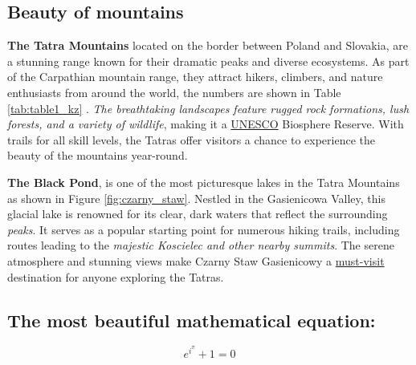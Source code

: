\setlength{\parskip}{10pt}
\subsection{Beauty of mountains}

\textbf{The Tatra Mountains} located on the border between Poland and Slovakia, are a stunning range known for their dramatic peaks and diverse ecosystems. As part of the Carpathian mountain range, they attract hikers, climbers, and nature enthusiasts from around the world, the numbers are shown in Table \ref{tab:table1_kz} . \textit{The breathtaking landscapes feature rugged rock formations, lush forests, and a variety of wildlife}, making it a \underline{UNESCO} Biosphere Reserve. With trails for all skill levels, the Tatras offer visitors a chance to experience the beauty of the mountains year-round.

\textbf{The Black Pond}, is one of the most picturesque lakes in the Tatra Mountains as shown in Figure \ref{fig:czarny_staw}. Nestled in the Gasienicowa Valley, this glacial lake is renowned for its clear, dark waters that reflect the surrounding \textit{peaks}. It serves as a popular starting point for numerous hiking trails, including routes leading to the \textit{majestic Koscielec and other nearby summits}. The serene atmosphere and stunning views make Czarny Staw Gasienicowy a \underline{must-visit} destination for anyone exploring the Tatras.

\medskip
\medskip
\medskip

\setlength{\parskip}{10pt}
    \subsection{The most beautiful mathematical equation:}
    
    \[e^{i^\pi}+1=0\]



